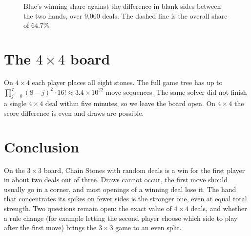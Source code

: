 \documentclass[11pt,a4paper]{article}
\begin{document}
\begin{figure}[ht]
\centering
{}
\caption{Blue's winning share against the difference in blank sides between the two hands, over 9{,}000 deals. The dashed line is the overall share of $64.7\%$.}
\label{fig:zero}
\end{figure}

\section{The $4\times4$ board}

On $4\times4$ each player places all eight stones. The full game tree has up to $\prod_{j=0}^{7}(8-j)^2\cdot 16! \approx 3.4\times10^{22}$ move sequences. The same solver did not finish a single $4\times4$ deal within five minutes, so we leave the board open. On $4\times4$ the score difference is even and draws are possible.

\section{Conclusion}

On the $3\times3$ board, Chain Stones with random deals is a win for the first player in about two deals out of three. Draws cannot occur, the first move should usually go in a corner, and most openings of a winning deal lose it. The hand that concentrates its spikes on fewer sides is the stronger one, even at equal total strength. Two questions remain open: the exact value of $4\times4$ deals, and whether a rule change (for example letting the second player choose which side to play after the first move) brings the $3\times3$ game to an even split.
\end{document}
